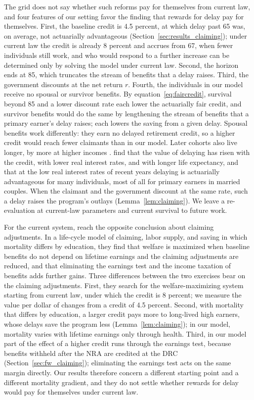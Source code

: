 The grid does not say whether such reforms pay for themselves from current law, and four features of our setting favor the finding that rewards for delay pay for themselves. First, the baseline credit is 4.5 percent, at which delay past 65 was, on average, not actuarially advantageous (Section~\ref{sec:results_claiming}); under current law the credit is already 8 percent and accrues from 67, when fewer individuals still work, and who would respond to a further increase can be determined only by solving the model under current law. Second, the horizon ends at 85, which truncates the stream of benefits that a delay raises. Third, the government discounts at the net return $r$. Fourth, the individuals in our model receive no spousal or survivor benefits. By equation~\eqref{eq:faircredit}, survival beyond 85 and a lower discount rate each lower the actuarially fair credit, and survivor benefits would do the same by lengthening the stream of benefits that a primary earner's delay raises; each lowers the saving from a given delay. Spousal benefits work differently: they earn no delayed retirement credit, so a higher credit would reach fewer claimants than in our model. Later cohorts also live longer, by more at higher incomes \citep{chetty2016association}. \citet{Shoven2014does} find that the value of delaying has risen with the credit, with lower real interest rates, and with longer life expectancy, and that at the low real interest rates of recent years delaying is actuarially advantageous for many individuals, most of all for primary earners in married couples. When the claimant and the government discount at the same rate, such a delay raises the program's outlays (Lemma~\ref{lem:claiming}). We leave a re-evaluation at current-law parameters and current survival to future work.

For the current system, \citet{Jones2023} reach the opposite conclusion about claiming adjustments. In a life-cycle model of claiming, labor supply, and saving in which mortality differs by education, they find that welfare is maximized when baseline benefits do not depend on lifetime earnings and the claiming adjustments are reduced, and that eliminating the earnings test and the income taxation of benefits adds further gains. Three differences between the two exercises bear on the claiming adjustments. First, they search for the welfare-maximizing system starting from current law, under which the credit is 8 percent; we measure the value per dollar of changes from a credit of 4.5 percent. Second, with mortality that differs by education, a larger credit pays more to long-lived high earners, whose delays save the program less (Lemma~\ref{lem:claiming}); in our model, mortality varies with lifetime earnings only through health. Third, in our model part of the effect of a higher credit runs through the earnings test, because benefits withheld after the NRA are credited at the DRC (Section~\ref{sec:fw_claiming}); eliminating the earnings test acts on the same margin directly. Our results therefore concern a different starting point and a different mortality gradient, and they do not settle whether rewards for delay would pay for themselves under current law.

